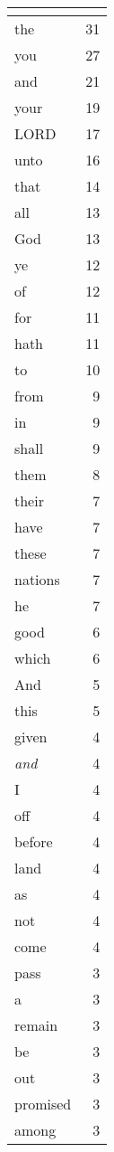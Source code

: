\begin{center}
\begin{longtable}{l|r}
\hline \multicolumn{2}{c}{{ }} \\ \hline
\endfoot 
the & 31\\ \hline 
you & 27\\ \hline 
and & 21\\ \hline 
your & 19\\ \hline 
LORD & 17\\ \hline 
unto & 16\\ \hline 
that & 14\\ \hline 
all & 13\\ \hline 
God & 13\\ \hline 
ye & 12\\ \hline 
of & 12\\ \hline 
for & 11\\ \hline 
hath & 11\\ \hline 
to & 10\\ \hline 
from & 9\\ \hline 
in & 9\\ \hline 
shall & 9\\ \hline 
them & 8\\ \hline 
their & 7\\ \hline 
have & 7\\ \hline 
these & 7\\ \hline 
nations & 7\\ \hline 
he & 7\\ \hline 
good & 6\\ \hline 
which & 6\\ \hline 
And & 5\\ \hline 
this & 5\\ \hline 
given & 4\\ \hline 
\emph{and} & 4\\ \hline 
I & 4\\ \hline 
off & 4\\ \hline 
before & 4\\ \hline 
land & 4\\ \hline 
as & 4\\ \hline 
not & 4\\ \hline 
come & 4\\ \hline 
pass & 3\\ \hline 
a & 3\\ \hline 
remain & 3\\ \hline 
be & 3\\ \hline 
out & 3\\ \hline 
promised & 3\\ \hline 
among & 3\\ \hline 

\end{longtable}
\end{center}
